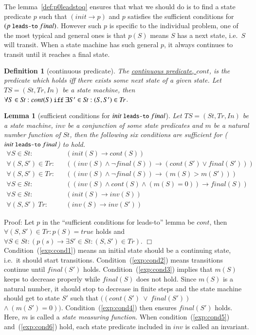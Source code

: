 \documentclass[12pt]{report}
\newtheorem{lemma}{Lemma}
\newtheorem{definition}{Definition}
\newcommand{\ra}{\rightarrow}
\newcommand{\mbstt}[1]{\mbox{\small{\tt {#1}}}}
\newcommand{\ul}{\underline}
\begin{document}
The lemma~\ref{def:p0leadstoq} ensures that what we should do is to find a state
predicate $p$ such that $(init\ra p)$ and $p$ satisfies the sufficient
conditions for $(p~\mbstt{leads-to}~final)$. However such $p$ is
specific to the individual problem, one of the most typical and
general ones is that $p(S)$ means $S$ has a next state, i.e.\ $S$ will
transit.  When a state machine has such general $p$, it always
continues to transit until it reaches a final state.

\begin{definition}[continuous predicate]
  The \ul{continuous predicate, $cont$}, is the predicate which holds
  iff there exists some next state of a given state.  Let
  $TS=(S\!t,T\!r,In)$ be a state machine, then $\forall S\in S\!t:cont(S)
  ~\mbstt{iff}~ \exists S'\in S\!t:(S,S')\in T\!r$.
\end{definition}

\begin{lemma}[sufficient conditions for $init~\mbstt{leads-to}~final$]
  Let $TS=(S\!t,T\!r,In)$ be a state machine, $inv$ be a conjunction of
  some state predicates and $m$ be a natural number function of $S\!t$,
  then the following six conditions are sufficient for
  ($init~\mbstt{leads-to}~final$) to hold.
  \begin{eqnarray}
  \label{exp:cond1}
  \forall S\in S\!t:&&(init(S)\ra cont(S))\\
  \label{exp:cond2}
  \forall (S,S')\in T\!r:&&((inv(S)\land\neg final(S))
  \ra(cont(S')\lor final(S')))\\
  \label{exp:cond3}
  \forall (S,S')\in T\!r:&&((inv(S)\land\neg final(S))\ra(m(S)> m(S')))\\
  \label{exp:cond4}
  \forall S\in S\!t:&&((inv(S)\land cont(S)\land(m(S) = 0))\ra final(S))\\
  \label{exp:cond5}
  \forall S\in S\!t:&&(init(S)\ra inv(S))\\
  \label{exp:cond6}
  \forall (S,S')\ T\!r:&&(inv(S)\ra inv(S'))
  \end{eqnarray}
\end{lemma}
Proof: Let $p$ in the ``sufficient conditions for leads-to'' lemma
be $cont$, then $\forall (S,S')\in T\!r:p(S)=true$ holds and
$\forall S\in S\!t:(p(s)\ra\exists S'\in S\!t:(S,S')\in T\!r)$. $\Box$\\

Condition~(\ref{exp:cond1}) means an initial state should be a
continuing state, i.e.\ it should start
transitions. Condition~(\ref{exp:cond2}) means transitions continue
until $final(S')$ holds. Condition~(\ref{exp:cond3}) implies that
$m(S)$ keeps to decrease properly while $final(S)$ does not
hold. Since $m(S)$ is a natural number, it should stop to decrease in
finite steps and the state machine should get to state $S'$ such that
$((cont(S')\ \lor\ final(S'))$ $\land\ (m(S') = 0))$.
Condition~(\ref{exp:cond4}) then ensures $final(S')$ holds. Here, $m$ is
called a {\it state measuring function}. When
condition~(\ref{exp:cond5}) and~(\ref{exp:cond6}) hold, each state
predicate included in $inv$ is called an invariant.
\end{document}
